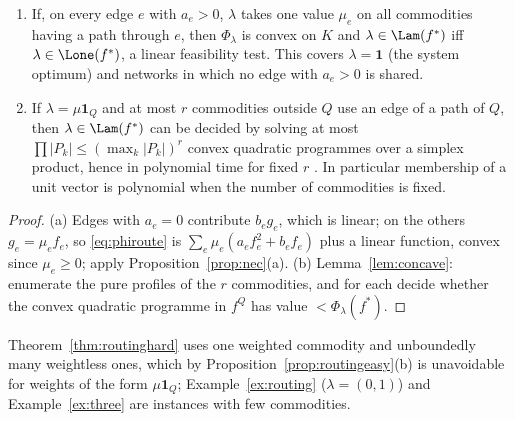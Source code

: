 \begin{proposition}\label{prop:routingeasy}
\begin{enumerate}[leftmargin=2em,label=(\alph*)]
\item If, on every edge $e$ with $a_e>0$, $\lambda$ takes one value $\mu_e$ on all commodities having a path through $e$, then $\Phi_\lambda$ is convex on $K$ and $\lambda\in\Lam(f^*)$ iff $\lambda\in\Lone(f^*)$, a linear feasibility test. This covers $\lambda=\mathbf 1$ (the system optimum) and networks in which no edge with $a_e>0$ is shared.
\item If $\lambda=\mu\mathbf 1_Q$ and at most $r$ commodities outside $Q$ use an edge of a path of $Q$, then $\lambda\in\Lam(f^*)$ can be decided by solving at most $\prod|P_k|\le(\max_k|P_k|)^r$ convex quadratic programmes over a simplex product, hence in polynomial time for fixed $r$ \citep{kozlovTarasovKhachiyan1980}. In particular membership of a unit vector is polynomial when the number of commodities is fixed.
\end{enumerate}
\end{proposition}
\begin{proof}
(a) Edges with $a_e=0$ contribute $b_eg_e$, which is linear; on the others $g_e=\mu_ef_e$, so \eqref{eq:phiroute} is $\sum_e\mu_e(a_ef_e^2+b_ef_e)$ plus a linear function, convex since $\mu_e\ge0$; apply Proposition~\ref{prop:nec}(a). (b) Lemma~\ref{lem:concave}: enumerate the pure profiles of the $r$ commodities, and for each decide whether the convex quadratic programme in $f^Q$ has value $<\Phi_\lambda(f^*)$.
\end{proof}

Theorem~\ref{thm:routinghard} uses one weighted commodity and unboundedly many weightless ones, which by Proposition~\ref{prop:routingeasy}(b) is unavoidable for weights of the form $\mu\mathbf 1_Q$; Example~\ref{ex:routing} ($\lambda=(0,1)$) and Example~\ref{ex:three} are instances with few commodities.

